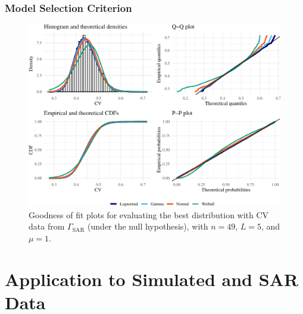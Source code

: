 \documentclass[aspectratio=1610,10pt]{beamer}
\begin{document}
		\begin{frame} \frametitle{\large{Model Selection Criterion}}%
\begin{figure}[H]

{\centering \includegraphics[width=0.8\linewidth]{../../Figures/PDF/Plot_cv_gamma-1} 

}

\caption{Goodness of fit plots for evaluating the best distribution with CV data from $\Gamma_{\text{SAR}}$ (under the null hypothesis), with $n=49$, $L=5$, and $\mu=1$.}\label{fig:Plot_cv_gamma}
\end{figure}



\end{frame} 
		
		
%
%


\section{Application to Simulated and SAR Data}
\end{document}
